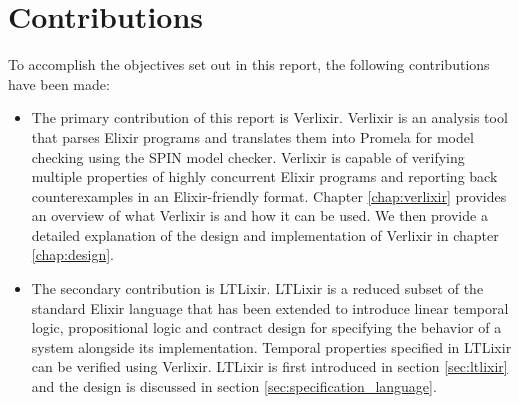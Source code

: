 \section{Contributions}
To accomplish the objectives set out in this report, the following contributions have been made:
\begin{itemize}
    \item The primary contribution of this report is Verlixir. Verlixir is an analysis tool that parses Elixir programs and translates them into Promela \cite{promela} for model checking using the SPIN \cite{spin} model checker. Verlixir is capable of verifying multiple properties of highly concurrent Elixir programs and reporting back counterexamples in an Elixir-friendly format. Chapter \ref{chap:verlixir} provides an overview of what Verlixir is and how it can be used. We then provide a detailed explanation of the design and implementation of Verlixir in chapter \ref{chap:design}.
    \item The secondary contribution is LTLixir. LTLixir is a reduced subset of the standard Elixir language that has been extended to introduce linear temporal logic, propositional logic and contract design for specifying the behavior of a system alongside its implementation. Temporal properties specified in LTLixir can be verified using Verlixir. LTLixir is first introduced in section \ref{sec:ltlixir} and the design is discussed in section \ref{sec:specification_language}.
\end{itemize}